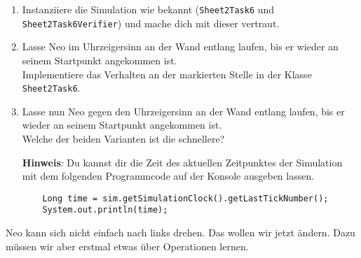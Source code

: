

\begin{enumerate}
    \item Instanziiere die Simulation wie bekannt (\lstinline{Sheet2Task6} und \lstinline{Sheet2Task6Verifier}) und mache dich mit dieser vertraut.
    \item Lasse Neo im Uhrzeigersinn an der Wand entlang laufen, bis er wieder an seinem Startpunkt angekommen ist.\\
        Implementiere das Verhalten an der markierten Stelle in der Klasse \lstinline{Sheet2Task6}.
    \item Lasse nun Neo gegen den Uhrzeigersinn an der Wand entlang laufen, bis er wieder an seinem Startpunkt angekommen ist.\\
        Welche der beiden Varianten ist die schnellere?

    \textbf{Hinweis}: Du kannst dir die Zeit des aktuellen Zeitpunktes der Simulation mit dem folgenden Programmcode auf der Konsole ausgeben lassen.

        \begin{lstlisting}
    Long time = sim.getSimulationClock().getLastTickNumber();
    System.out.println(time);
        \end{lstlisting}

        
\end{enumerate}

        Neo kann sich nicht einfach nach links drehen.
        Das wollen wir jetzt ändern.
        Dazu müssen wir aber erstmal etwas über Operationen lernen.

